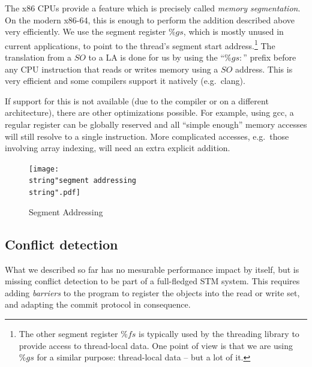 \documentclass{sigplanconf}
\begin{document}
The x86 CPUs provide a feature which is precisely called \emph{memory
segmentation}.  On the modern x86-64, this is enough to perform the
addition described above very efficiently.  We use the segment register
$\%gs$, which is mostly unused in current applications, to point to the
thread's segment start address.\footnote{The other segment register
$\%fs$ is typically used by the threading library to provide access to
thread-local data.  One point of view is that we are using $\%gs$ for a
similar purpose: thread-local data -- but a lot of it.}  The translation
from a $SO$ to a LA is done for us by using the ``$\%gs\colon$'' prefix
before any CPU instruction that reads or writes memory using a $SO$
address.  This is very efficient and some compilers support it natively
(e.g.\ clang).

If support for this is not available (due to the compiler or on a
different architecture), there are other optimizations possible.  For
example, using gcc, a regular register can be globally reserved and
all ``simple enough'' memory accesses will still resolve to a single
instruction.  More complicated accesses, e.g.\ those involving array
indexing, will need an extra explicit addition.

\begin{figure}[t]
  \centering
  \texttt{[image: \\string"segment addressing\\string".pdf]}
  \caption{Segment Addressing\label{fig:Segment-Addressing}}
\end{figure}


\subsection{Conflict detection}

What we described so far has no mesurable performance impact by itself,
but is missing conflict detection to be part of a full-fledged STM
system.  This requires adding \emph{barriers} to the program to register
the objects into the read or write set, and adapting the commit
protocol in consequence.
\end{document}
